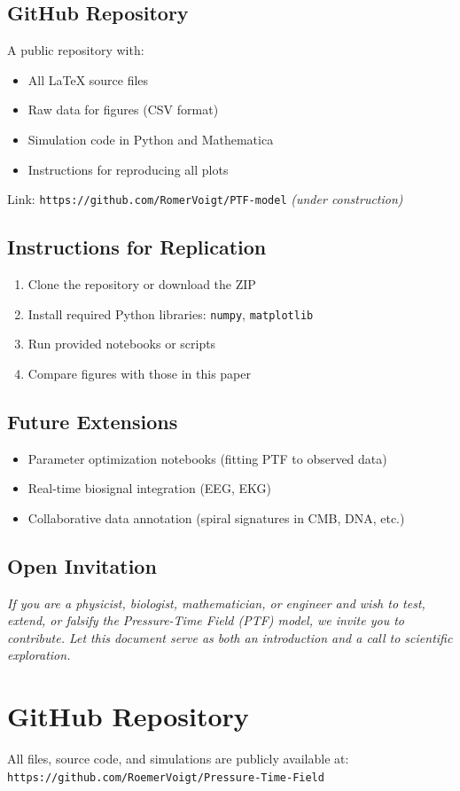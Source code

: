\documentclass[a4paper,12pt]{article}
\begin{document}
\subsection{GitHub Repository}

A public repository with:
\begin{itemize}
    \item All LaTeX source files
    \item Raw data for figures (CSV format)
    \item Simulation code in Python and Mathematica
    \item Instructions for reproducing all plots
\end{itemize}

\noindent
Link: \texttt{https://github.com/RomerVoigt/PTF-model} \quad \textit{(under construction)}

\subsection{Instructions for Replication}

\begin{enumerate}
    \item Clone the repository or download the ZIP
    \item Install required Python libraries: \texttt{numpy}, \texttt{matplotlib}
    \item Run provided notebooks or scripts
    \item Compare figures with those in this paper
\end{enumerate}

\subsection{Future Extensions}

\begin{itemize}
    \item Parameter optimization notebooks (fitting PTF to observed data)
    \item Real-time biosignal integration (EEG, EKG)
    \item Collaborative data annotation (spiral signatures in CMB, DNA, etc.)
\end{itemize}

\subsection{Open Invitation}

\textit{If you are a physicist, biologist, mathematician, or engineer and wish to test, extend, or falsify the Pressure-Time Field (PTF) model, we invite you to contribute. Let this document serve as both an introduction and a call to scientific exploration.}

\section*{GitHub Repository}
All files, source code, and simulations are publicly available at:  
\texttt{https://github.com/RoemerVoigt/Pressure-Time-Field}
\end{document}
